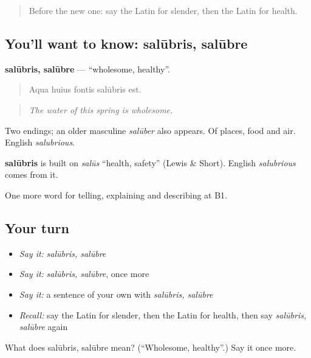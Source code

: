 \label{lesson:LA-C523-salubris}



\begin{quote}
Before the new one: say the Latin for slender, then the Latin for health.
\end{quote}

\subsection*{You'll want to know: salūbris, salūbre}
\textbf{salūbris, salūbre} — \textquotedblleft{}wholesome, healthy\textquotedblright{}.

\begin{quote}
Aqua huius fontis salūbris est.
\end{quote}

\begin{quote}
\emph{The water of this spring is wholesome.}
\end{quote}

Two endings; an older masculine \emph{salūber} also appears. Of places, food and air. English \emph{salubrious}.

\begin{cousinweb}
\textbf{salūbris} is built on \emph{salūs} \textquotedblleft{}health, safety\textquotedblright{} (Lewis \& Short). English \emph{salubrious} comes from it.
\end{cousinweb}

\begin{grammarlens}[title={What you've built}]
One more word for telling, explaining and describing at B1.
\end{grammarlens}

\subsection*{Your turn}
\begin{itemize}
\raggedright
  \item \emph{Say it:} \emph{salūbris, salūbre}
  \item \emph{Say it:} \emph{salūbris, salūbre}, once more
  \item \emph{Say it:} a sentence of your own with \emph{salūbris, salūbre}
  \item \emph{Recall:} say the Latin for slender, then the Latin for health, then say \emph{salūbris, salūbre} again
\end{itemize}

\begin{tcolorbox}[breakable,colback=teal!4,colframe=teal!35!black,title={Before you move on}]
What does salūbris, salūbre mean? (\textquotedblleft{}Wholesome, healthy\textquotedblright{}.) Say it once more.
\end{tcolorbox}
